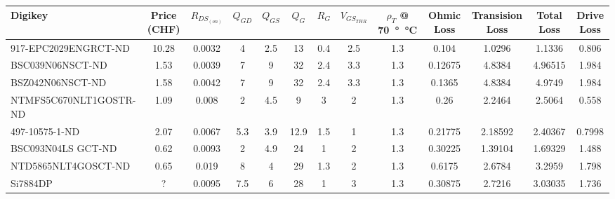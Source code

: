 \begin{table}[th!]
    \begin{center}
        \caption{}
        \label{tab:circuit:buck:mosfet}
        \begin{tabular}{lcccccccccccc}
            \toprule
            Digikey                 & Price (CHF) & $R_{DS_{(on)}}$ & $Q_{GD}$ & $Q_{GS}$ & $Q_G$ & $R_G$ & $V_{GS_{THR}}$ & $\rho_T$ @ \SI{70}{\degree\celsius} & Ohmic Loss & Transision Loss & Total Loss & Drive Loss \\
            \midrule
            917-EPC2029ENGRCT-ND    & 10.28       & 0.0032          & 4        & 2.5      & 13    & 0.4   & 2.5            & 1.3                                 & 0.104      & 1.0296          & 1.1336     & 0.806 \\
            BSC039N06NSCT-ND        & 1.53        & 0.0039          & 7        & 9        & 32    & 2.4   & 3.3            & 1.3                                 & 0.12675    & 4.8384          & 4.96515    & 1.984 \\
            BSZ042N06NSCT-ND        & 1.58        & 0.0042          & 7        & 9        & 32    & 2.4   & 3.3            & 1.3                                 & 0.1365     & 4.8384          & 4.9749     & 1.984 \\
            NTMFS5C670NLT1GOSTR-ND  & 1.09        & 0.008           & 2        & 4.5      & 9     & 3     & 2              & 1.3                                 & 0.26       & 2.2464          & 2.5064     & 0.558 \\
            497-10575-1-ND          & 2.07        & 0.0067          & 5.3      & 3.9      & 12.9  & 1.5   & 1              & 1.3                                 & 0.21775    & 2.18592         & 2.40367    & 0.7998 \\
            BSC093N04LS GCT-ND      & 0.62        & 0.0093          & 2        & 4.9      & 24    & 1     & 2              & 1.3                                 & 0.30225    & 1.39104         & 1.69329    & 1.488 \\
            NTD5865NLT4GOSCT-ND     & 0.65        & 0.019           & 8        & 4        & 29    & 1.3   & 2              & 1.3                                 & 0.6175     & 2.6784          & 3.2959     & 1.798 \\
            Si7884DP                & ?           & 0.0095          & 7.5      & 6        & 28    & 1     & 3              & 1.3                                 & 0.30875    & 2.7216          & 3.03035    & 1.736 \\
            \bottomrule
        \end{tabular}
    \end{center}
\end{table}


